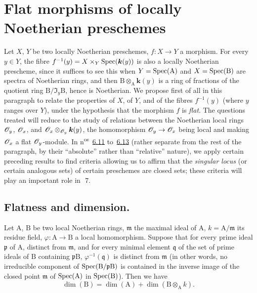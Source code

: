 \section{Flat morphisms of locally Noetherian preschemes}
\label{section:IV.6}

Let $X$, $Y$ be two locally Noetherian preschemes, $f:X\to Y$ a morphism.
For every $y\in Y$, the fibre $f^{-1}(y)=X\times_Y\operatorname{Spec}(\boldsymbol{k}(y))$ is also a locally Noetherian prescheme, since it suffices to see this when $Y=\operatorname{Spec}(\mathrm{A})$ and $X=\operatorname{Spec}(\mathrm{B})$ are spectra of Noetherian rings, and then $\mathrm{B}\otimes_\mathrm{A}\boldsymbol{k}(y)$ is a ring of fractions of the quotient ring $\mathrm{B}/\mathfrak{I}_y\mathrm{B}$, hence is Noetherian.
We propose first of all in this paragraph to relate the properties of $X$, of $Y$, and of the fibres $f^{-1}(y)$ (where $y$ ranges over $Y$), under the hypothesis that the morphism $f$ is \emph{flat}.
The questions treated will reduce to the study of relations between the Noetherian local rings $\mathscr{O}_y$, $\mathscr{O}_x$, and $\mathscr{O}_x\otimes_{\mathscr{O}_y}\boldsymbol{k}(y)$, the homomorphism $\mathscr{O}_y\to\mathscr{O}_x$ being local and making $\mathscr{O}_x$ a flat $\mathscr{O}_y$-module.
In n\textsuperscript{os}~{\hyperref[IV.6.11]{6.11}} to~{\hyperref[IV.6.13]{6.13}} (rather separate from the rest of the paragraph, by their ``absolute'' rather than ``relative'' nature), we apply certain preceding results to find
criteria allowing us to affirm that the \emph{singular locus} (or certain analogous sets) of certain preschemes are closed sets; these criteria will play an important role in~\textsection\,7.

\subsection{Flatness and dimension.}
\label{subsection:IV.6.1}

\begin{proposition}[6.1.1]
\label{IV.6.1.1}
Let $\mathrm{A}$, $\mathrm{B}$ be two local Noetherian rings, $\mathfrak{m}$ the maximal ideal of $\mathrm{A}$, $k=\mathrm{A}/\mathfrak{m}$ its residue field, $\varphi:\mathrm{A}\to\mathrm{B}$ a local homomorphism.
Suppose that for every prime ideal $\mathfrak{p}$ of $\mathrm{A}$, distinct from $\mathfrak{m}$, and for every minimal element $\mathfrak{q}$ of the set of prime ideals of $\mathrm{B}$ containing $\mathfrak{p}\mathrm{B}$, $\varphi^{-1}(\mathfrak{q})$ is distinct from $\mathfrak{m}$ \textup{(in other words, no irreducible component of $\operatorname{Spec}(\mathrm{B}/\mathfrak{p}\mathrm{B})$ is contained in the inverse image of the closed point $\mathfrak{m}$ of $\operatorname{Spec}(\mathrm{A})$ in $\operatorname{Spec}(\mathrm{B})$)}.
Then we have
\begin{equation}
  \dim(\mathrm{B})=\dim(\mathrm{A})+\dim(\mathrm{B}\otimes_\mathrm{A} k).
  \tag{6.1.1.1}
\label{IV.6.1.1.1}
\end{equation}
\end{proposition}

